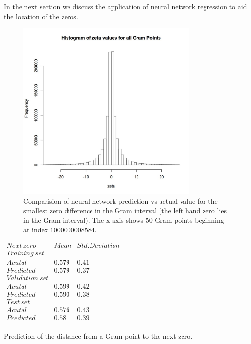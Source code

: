 \documentclass[twoside]{article}
\begin{document}
In the next section we discuss the application of neural network regression to aid
the location of the zeros. 

\begin{figure}
\centering
\includegraphics[width=0.8\textwidth]{rzeta.jpg}
\caption[]{ 
 Comparision of neural network prediction vs actual value
 for the smallest zero difference in the Gram interval
 (the left hand zero lies in the Gram interval).
 The x axis shows $50$ Gram points beginning at index $1000000008584$.
 }
\label{ZeroDifferences}
\end{figure}


\begin{table}
\centering \(\begin{array}{c|c|c}
 Next~zero & Mean & Std. Deviation \\
\hline
Training~set \\
\hline
Acutal       & 0.579 & 0.41 \\
Predicted     & 0.579 & 0.37 \\
\hline
Validation~set \\
\hline
Acutal       & 0.599 & 0.42 \\
Predicted     & 0.590 & 0.38 \\
\hline
Test~set \\
\hline
Acutal       & 0.576& 0.43 \\
Predicted     & 0.581 & 0.39 \\

\end{array}\)
\caption{Prediction of the distance from a 
Gram point to the next zero.} \label{tab:nextZero}
\end{table}
\end{document}
